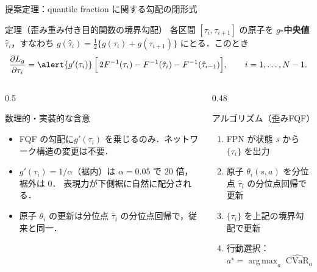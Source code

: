 \documentclass[aspectratio=169, 10pt]{beamer}
\newcommand{\blue}[1]{\textcolor{blue!80!black}{#1}}
\providecommand{\Finv}{}\renewcommand{\Finv}{F^{-1}}
\DeclareMathOperator{\CVaR}{CVaR}
\DeclareMathOperator*{\argmax}{arg\,max}
\newcommand{\Lg}{L_g}
\begin{document}
\begin{frame}{提案定理：quantile fraction に関する勾配の閉形式}
  \begin{exampleblock}{定理（歪み重み付き目的関数の境界勾配）}
    各区間 $[\tau_i,\tau_{i+1}]$ の原子を \textbf{$g$-中央値} $\hat\tau_i$，すなわち
    $g(\hat\tau_i)=\tfrac12\{g(\tau_i)+g(\tau_{i+1})\}$ にとる．このとき
    \[
      \frac{\partial \Lg}{\partial \tau_i}
      = \alert{g'(\tau_i)}\,\Bigl[\,2\Finv(\tau_i)-\Finv(\hat\tau_i)-\Finv(\hat\tau_{i-1})\Bigr],
      \qquad i=1,\dots,N-1 .
    \]
  \end{exampleblock}
  \begin{columns}[T]
    \begin{column}{0.5\linewidth}
      \begin{block}{数理的・実装的な含意}
        \small
        \begin{itemize}
          \item FQF の勾配に\alert{$g'(\tau_i)$ を乗じるのみ}．ネットワーク構造の変更は不要．
          \item $g'(\tau_i)=1/\alpha$（裾内）は $\alpha=0.05$ で $20$ 倍，裾外は $0$．
                表現力が\blue{下側裾に自然に配分}される．
          \item 原子 $\theta_i$ の更新は分位点 $\hat\tau_i$ の分位点回帰で，従来と同一．
        \end{itemize}
      \end{block}
    \end{column}
    \begin{column}{0.48\linewidth}
      \begin{block}{アルゴリズム（歪みFQF）}
        \small
        \begin{enumerate}
          \item FPN が状態 $s$ から $\{\tau_i\}$ を出力
          \item 原子 $\theta_i(s,a)$ を分位点 $\hat\tau_i$ の分位点回帰で更新
          \item $\{\tau_i\}$ を上記の境界勾配で更新
          \item 行動選択：$a^\star=\argmax_a \widehat{\CVaR}_\alpha(Z(s,a))$
        \end{enumerate}
      \end{block}
    \end{column}
  \end{columns}
\end{frame}
\end{document}
